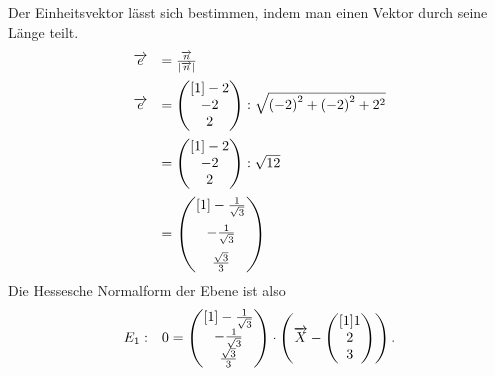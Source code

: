 Der Einheitsvektor lässt sich bestimmen, indem man einen Vektor durch seine Länge teilt.
\begin{equation*}
	\begin{array}{ r l }
		\vec{e} & =\frac{\vec{n}}{| \vec{n}| }\vspace{2mm}\\
		\vec{e} & =\begin{pmatrix}[1]
			-2\\
			-2\\
			2
		\end{pmatrix} :\sqrt{{(-2)}^{2} + {(-2)}^{2} + {2}^{2}}\vspace{2mm}\\
		& =\begin{pmatrix}[1]
			-2\\
			-2\\
			2
		\end{pmatrix} :\sqrt{12}\vspace{2mm}\\
		& =\begin{pmatrix}[1]
			-\frac{1}{\sqrt{3}}\vspace{2mm}\\
			-\frac{1}{\sqrt{3}}\vspace{2mm}\\
			\frac{\sqrt{3}}{3}
		\end{pmatrix}
	\end{array}
\end{equation*}
Die Hessesche Normalform der Ebene ist also
\begin{equation*}
	\begin{array}{ r l }
		E_{1} : & 0=\begin{pmatrix}[1]
			-\frac{1}{\sqrt{3}}\\
			-\frac{1}{\sqrt{3}}\\
			\frac{\sqrt{3}}{3}
		\end{pmatrix} \cdotp \left(\vec{X} -\begin{pmatrix}[1]
			1\\
			2\\
			3
		\end{pmatrix}\right)\text{.}
	\end{array}
\end{equation*}


